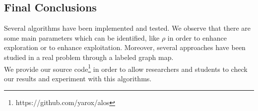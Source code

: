 \newpage
\subsection{Final Conclusions}

Several algorithms have been implemented and tested. We observe that there are some main parameters which can be identified, like $\rho$ in order to enhance exploration or to enhance exploitation. Moreover, several approaches have been studied in a real problem through a labeled graph map. 
\\
We provide our source code\footnote{https://github.com/yarox/alos} in order to allow researchers and students to check our results and experiment with this algorithms.